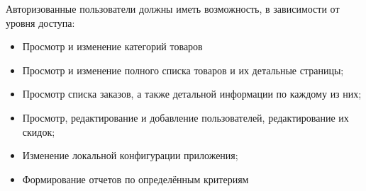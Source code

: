 Авторизованные пользователи должны иметь возможность, в зависимости от уровня доступа:

\begin{itemize}
    \item Просмотр и изменение категорий товаров
    \item Просмотр и изменение полного списка товаров и их детальные страницы;
    \item Просмотр списка заказов, а также детальной информации по каждому из них;
    \item Просмотр, редактирование и добавление пользователей, редактирование их скидок;
    \item Изменение локальной конфигурации приложения;
    \item Формирование отчетов по определённым критериям
\end{itemize}